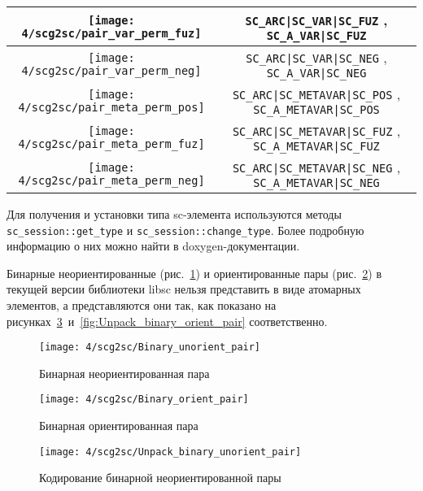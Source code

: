 \begin{table}[ht]
\begin{tabular}{|c|c|}
    \hline
    \texttt{[image: 4/scg2sc/pair\_var\_perm\_fuz]} & \verb+SC_ARC|SC_VAR|SC_FUZ+
    , \verb+SC_A_VAR|SC_FUZ+ \\

    \hline
    \texttt{[image: 4/scg2sc/pair\_var\_perm\_neg]} & \verb+SC_ARC|SC_VAR|SC_NEG+
    , \verb+SC_A_VAR|SC_NEG+ \\

    \hline
    \texttt{[image: 4/scg2sc/pair\_meta\_perm\_pos]} & \verb+SC_ARC|SC_METAVAR|SC_POS+
    , \verb+SC_A_METAVAR|SC_POS+ \\

    \hline
    \texttt{[image: 4/scg2sc/pair\_meta\_perm\_fuz]} & \verb+SC_ARC|SC_METAVAR|SC_FUZ+
    , \verb+SC_A_METAVAR|SC_FUZ+ \\

    \hline
    \texttt{[image: 4/scg2sc/pair\_meta\_perm\_neg]} & \verb+SC_ARC|SC_METAVAR|SC_NEG+
    , \verb+SC_A_METAVAR|SC_NEG+ \\

    \hline
  \end{tabular}
  \label{tab:SCgType2SCType}
\end{table}

Для получения и установки типа sc-элемента используются методы
\lstinline{sc_session::get_type} и
\lstinline{sc_session::change_type}. Более подробную информацию о них
можно найти в doxygen-документации.

Бинарные неориентированные (рис.~\ref{fig:Binary_unorient_pair}) и
ориентированные пары (рис.~\ref{fig:Binary_orient_pair}) в текущей
версии библиотеки libsc нельзя представить в виде атомарных элементов,
а представляются они так, как показано на
рисунках~\ref{fig:Unpack_binary_unorient_pair}~и~\ref{fig:Unpack_binary_orient_pair}
соответственно.

\begin{figure}[h!]
  \centering
  \texttt{[image: 4/scg2sc/Binary\_unorient\_pair]}
  \caption{Бинарная неориентированная пара}
  \label{fig:Binary_unorient_pair}
\end{figure}

\begin{figure}[h!]
  \centering
  \texttt{[image: 4/scg2sc/Binary\_orient\_pair]}
  \caption{Бинарная ориентированная пара}
  \label{fig:Binary_orient_pair}
\end{figure}

\begin{figure}[h!]
  \centering
  \texttt{[image: 4/scg2sc/Unpack\_binary\_unorient\_pair]}
  \caption{Кодирование бинарной неориентированной пары}
  \label{fig:Unpack_binary_unorient_pair}
\end{figure}

